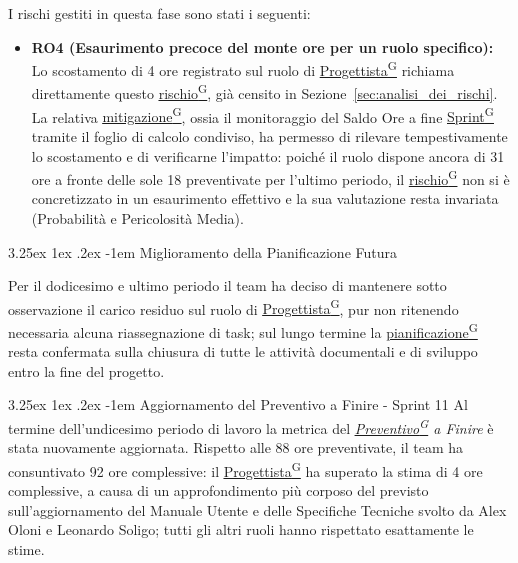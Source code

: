 \documentclass[a4paper,12pt]{article}
\makeatletter
\renewcommand\paragraph{\@startsection{paragraph}{5}{\z@}%
  {3.25ex \@plus1ex \@minus.2ex}%
  {-1em}%
  {\normalfont\normalsize\bfseries}}
\providecommand{\glslink}[2]{\href{https://alittlebyte-19.github.io/Documentazione/glossario.html\#gls-#1}{\underline{#2}\textsuperscript{\scriptsize G}}}
\makeatother
\begin{document}
I rischi gestiti in questa fase sono stati i seguenti:
\begin{itemize}
    \item \textbf{RO4 (Esaurimento precoce del monte ore per un ruolo specifico):} Lo scostamento di 4 ore registrato sul ruolo di \glslink{progettista}{Progettista} richiama direttamente questo \glslink{rischio}{rischio}, già censito in Sezione~\ref{sec:analisi_dei_rischi}. La relativa \glslink{mitigazione-dei-rischi}{mitigazione}, ossia il monitoraggio del Saldo Ore a fine \glslink{sprint}{Sprint} tramite il foglio di calcolo condiviso, ha permesso di rilevare tempestivamente lo scostamento e di verificarne l'impatto: poiché il ruolo dispone ancora di 31 ore a fronte delle sole 18 preventivate per l'ultimo periodo, il \glslink{rischio}{rischio} non si è concretizzato in un esaurimento effettivo e la sua valutazione resta invariata (Probabilità e Pericolosità Media).
\end{itemize}


\paragraph{Miglioramento della Pianificazione Futura}

Per il dodicesimo e ultimo periodo il team ha deciso di mantenere sotto osservazione il carico residuo sul ruolo di \glslink{progettista}{Progettista}, pur non ritenendo necessaria alcuna riassegnazione di task; sul lungo termine la \glslink{pianificazione}{pianificazione} resta confermata sulla chiusura di tutte le attività documentali e di sviluppo entro la fine del progetto.


\paragraph{Aggiornamento del Preventivo a Finire - Sprint 11}
Al termine dell'undicesimo periodo di lavoro la metrica del \textit{\glslink{preventivo}{Preventivo} a Finire} è stata nuovamente aggiornata. Rispetto alle 88 ore preventivate, il team ha consuntivato 92 ore complessive: il \glslink{progettista}{Progettista} ha superato la stima di 4 ore complessive, a causa di un approfondimento più corposo del previsto sull'aggiornamento del Manuale Utente e delle Specifiche Tecniche svolto da Alex Oloni e Leonardo Soligo; tutti gli altri ruoli hanno rispettato esattamente le stime.
\end{document}
